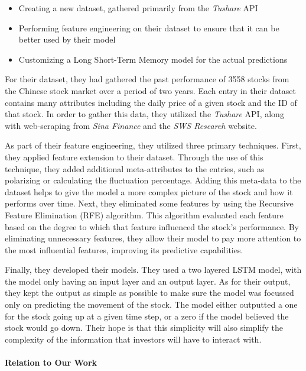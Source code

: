 \documentclass{article}
\begin{document}
    \begin{itemize}
        \item Creating a new dataset, gathered primarily from the \textit{Tushare} API
        \item Performing feature engineering on their dataset to ensure that it can be better used by their model
        \item Customizing a Long Short-Term Memory model for the actual predictions
    \end{itemize}

    For their dataset, they had gathered the past performance of 3558 stocks from the Chinese stock market over
    a period of two years.  Each entry in their dataset contains many attributes including the daily price of a
    given stock and the ID of that stock.  In order to gather this data, they utilized the \textit{Tushare} API, along
    with web-scraping from \textit{Sina Finance} and the \textit{SWS Research} website.

    As part of their feature engineering, they utilized three primary techniques.  First, they applied feature extension
    to their dataset.  Through the use of this technique, they added additional meta-attributes to the entries, such
    as polarizing or calculating the fluctuation percentage.  Adding this meta-data to the dataset helps to give the model
    a more complex picture of the stock and how it performs over time.  Next, they eliminated some features by using the
    Recursive Feature Elimination (RFE) algorithm.  This algorithm evaluated each feature based on the degree to which
    that feature influenced the stock's performance.  By eliminating unnecessary features, they allow their model to
    pay more attention to the most influential features, improving its predictive capabilities.

    Finally, they developed their models.  They used a two layered LSTM model, with the model only having an input layer
    and an output layer.  As for their output, they kept the output as simple as possible to make sure the model
    was focussed only on predicting the movement of the stock.  The model either outputted a one for the stock going up at
    a given time step, or a zero if the model believed the stock would go down.  Their hope is that this simplicity
    will also simplify the complexity of the information that investors will have to interact with.

    \paragraph{Relation to Our Work}
\end{document}
